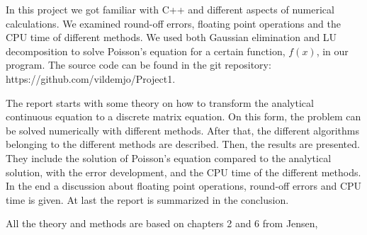 In this project we got familiar with C++ and different aspects of numerical calculations. We examined round-off errors, floating point operations and the CPU time of different methods. We used both Gaussian elimination and LU decomposition to solve Poisson's equation for a certain function, $f(x)$, in our program. The source code can be found in the git repository:\\ https://github.com/vildemjo/Project1.

The report starts with some theory on how to transform the analytical continuous equation to a discrete matrix equation. On this form, the problem can be solved numerically with different methods. After that, the different algorithms belonging to the different methods are described. Then, the results are presented. They include the solution of Poisson's equation compared to the analytical solution, with the error development, and the CPU time of the different methods. In the end a discussion about floating point operations, round-off errors and CPU time is given. At last the report is summarized in the conclusion.

All the theory and methods are based on chapters 2 and 6 from Jensen, \cite{Jensen}